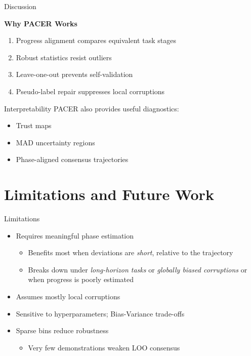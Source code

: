 \documentclass{beamer}
\begin{document}
\begin{frame}{Discussion}

    \textbf{Why PACER Works}

    \begin{enumerate}
        \item Progress alignment compares equivalent task stages
        \item Robust statistics resist outliers
        \item Leave-one-out prevents self-validation
        \item Pseudo-label repair suppresses local corruptions
    \end{enumerate}

    \vspace{1em}

    \begin{block}{Interpretability}
        PACER also provides useful diagnostics:
        \begin{itemize}
            \item Trust maps
            \item MAD uncertainty regions
            \item Phase-aligned consensus trajectories
        \end{itemize}
    \end{block}

\end{frame}

\section{Limitations and Future Work}

\begin{frame}{Limitations}

    \begin{itemize}
        \item Requires meaningful phase estimation
            \begin{itemize}
                \item Benefits most when deviations are \textit{short}, relative to the trajectory
                \item Breaks down under \textit{long-horizon tasks} or \textit{globally biased corruptions} or when progress is poorly estimated
            \end{itemize}
        \item Assumes mostly local corruptions
        \item Sensitive to hyperparameters; Bias-Variance trade-offs
        \item Sparse bins reduce robustness
            \begin{itemize}
                \item Very few demonstrations weaken LOO consensus
            \end{itemize}

    \end{itemize}

\end{frame}
\end{document}
